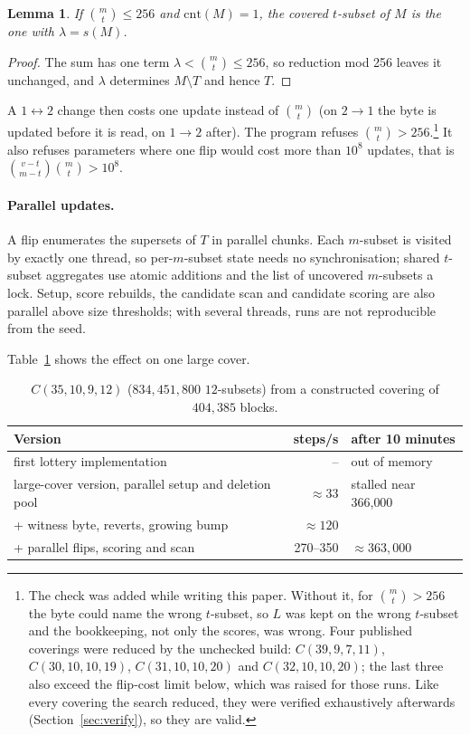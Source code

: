 \documentclass[11pt]{article}
\newtheorem{lemma}{Lemma}
\theoremstyle{remark}
\newcommand{\cnt}{\mathrm{cnt}}
\begin{document}
\begin{lemma}\label{lem:witness}
If $\binom{m}{t}\le 256$ and $\cnt(M)=1$, the covered $t$-subset of $M$ is the one with $\lambda=s(M)$.
\end{lemma}
\begin{proof}
The sum has one term $\lambda<\binom{m}{t}\le 256$, so reduction mod 256 leaves it unchanged, and $\lambda$ determines
$M\setminus T$ and hence $T$.
\end{proof}

A $1\leftrightarrow 2$ change then costs one update instead of $\binom{m}{t}$ (on $2\to 1$ the byte is updated before
it is read, on $1\to 2$ after). The program refuses $\binom{m}{t}>256$.\footnote{The check was added while writing this
paper. Without it, for $\binom{m}{t}>256$ the byte could name the wrong $t$-subset, so $L$ was kept on the wrong
$t$-subset and the bookkeeping, not only the scores, was wrong. Four published coverings were reduced by the unchecked
build: $C(39,9,7,11)$, $C(30,10,10,19)$, $C(31,10,10,20)$ and $C(32,10,10,20)$; the last three also exceed the flip-cost
limit below, which was raised for those runs. Like every covering the search
reduced, they were verified exhaustively afterwards (Section~\ref{sec:verify}), so they are valid.} It also refuses
parameters where one flip would cost more than $10^8$ updates, that is $\binom{v-t}{m-t}\binom{m}{t}>10^8$.

\paragraph{Parallel updates.} A flip enumerates the supersets of $T$ in parallel chunks. Each $m$-subset is visited by
exactly one thread, so per-$m$-subset state needs no synchronisation; shared $t$-subset aggregates use atomic additions
and the list of uncovered $m$-subsets a lock. Setup, score rebuilds, the candidate scan and candidate scoring are also
parallel above size thresholds; with several threads, runs are not reproducible from the seed.

Table~\ref{tab:big} shows the effect on one large cover.

\begin{table}[t]
\centering
\begin{tabular}{lrl}
\toprule
Version & steps/s & after 10 minutes \\
\midrule
first lottery implementation & -- & out of memory \\
large-cover version, parallel setup and deletion pool & $\approx 33$ & stalled near 366{,}000 \\
+ witness byte, reverts, growing bump & $\approx 120$ & \\
+ parallel flips, scoring and scan & 270--350 & $\approx 363{,}000$ \\
\bottomrule
\end{tabular}
\caption{$C(35,10,9,12)$ ($834{,}451{,}800$ $12$-subsets) from a constructed covering of $404{,}385$ blocks.}
\label{tab:big}
\end{table}
\end{document}
